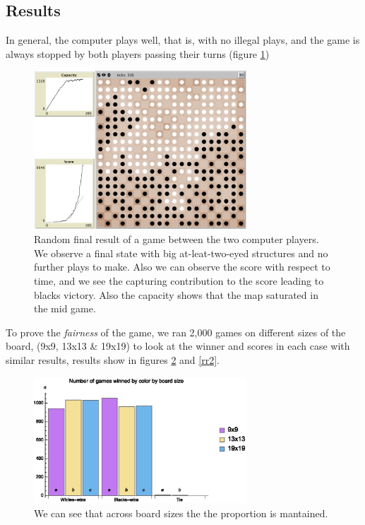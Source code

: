 \documentclass[a4paper,10pt,twocolumn]{article}
\begin{document}
\begin{CJK*}{UTF8}{gbsn}
\section{Results}

In general, the computer plays well, that is, with no illegal plays, and the game is always stopped by both players passing their turns (figure \ref{r1})

\begin{figure}[!ht]
\begin{center}
\includegraphics[width=8cm]{game1.png}
\caption{\footnotesize Random final result of a game between the two computer players. We observe a final state with big at-leat-two-eyed structures and no further plays to make. Also we can observe the score with respect to time, and we see the capturing contribution to the score leading to blacks victory. Also the capacity shows that the map saturated in the mid game. \label{r1}}
\end{center}
\end{figure}

To prove the \emph{fairness} of the game, we ran 2,000 games on different sizes of the board, (9x9, 13x13 \& 19x19) to look at the winner and scores in each case with similar results, results show in figures \ref{rr1} and \ref{rr2}.

\begin{figure}[!ht]
\begin{center}
\includegraphics[width=8cm]{r1.eps}
\caption{\footnotesize We can see that across board sizes the the proportion is mantained. \label{rr1}}
\end{center}
\end{figure}


\end{CJK*}
\end{document}
